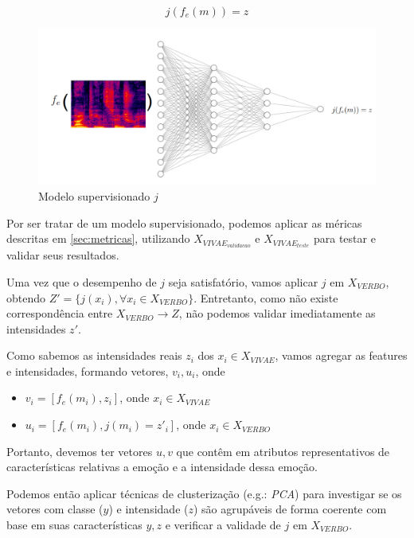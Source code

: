 \begin{equation}
    j(f_e(m)) = z
\end{equation}

\begin{figure}[!h]
\centering
\includegraphics[width=1.0\textwidth]{imagens/p-supervisionado.png}
\caption{\label{fig:jsupervisionado}Modelo supervisionado $j$}
\end{figure}

Por ser tratar de um modelo supervisionado, podemos aplicar as méricas descritas em \ref{sec:metricas}, utilizando $X_{VIVAE_{validacao}}$ e $X_{VIVAE_{teste}}$ para testar e validar seus resultados.

Uma vez que o desempenho de $j$ seja satisfatório, vamos aplicar $j$ em $X_{VERBO}$, obtendo $Z' = \{j(x_i), \forall x_i \in X_{VERBO}\}$. Entretanto, como não existe correspondência entre $X_{VERBO} \rightarrow Z$, não podemos validar imediatamente as intensidades $z'$.

Como sabemos as intensidades reais $z_i$ dos $x_i \in X_{VIVAE}$, vamos agregar as features e intensidades, formando vetores, $v_i, u_i$, onde

\begin{itemize}
    \item $v_i = [f_e(m_i), z_i]$, onde $x_i \in X_{VIVAE}$
    \item $u_i = [f_e(m_i), j(m_i) = z'_i]$, onde $x_i \in X_{VERBO}$
\end{itemize}

Portanto, devemos ter vetores $u,v$ que contêm em atributos representativos de características relativas a emoção e a intensidade dessa emoção.

Podemos então aplicar técnicas de clusterização (e.g.: \textit{PCA}) para investigar se os vetores com classe ($y$) e intensidade ($z$) são agrupáveis de forma coerente com base em suas características $y, z$ e verificar a validade de $j$ em $X_{VERBO}$.

